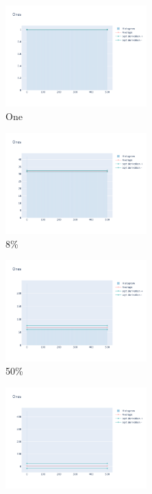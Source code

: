 \documentclass[12pt, fleqn]{report}                             %
\theoremstyle{break}                                            %
\begin{document}
      \begin{figure}[ht!]
        \centering
        \begin{subfigure}[b]{0.4\linewidth}
          \includegraphics[width=0.6\textwidth]{Images/4/dia-a.png}
          \caption{One}
        \end{subfigure}
        \begin{subfigure}[b]{0.4\linewidth}
          \includegraphics[width=0.6\textwidth]{Images/4/dia-b.png}
          \caption{8\%}
        \end{subfigure}
        \begin{subfigure}[b]{0.4\linewidth}
          \includegraphics[width=0.6\textwidth]{Images/4/dia-c.png}
          \caption{50\%}
        \end{subfigure}
        \begin{subfigure}[b]{0.4\linewidth}
          \includegraphics[width=0.6\textwidth]{Images/4/dia-d.png}

\end{subfigure}
\end{figure}
\end{document}
